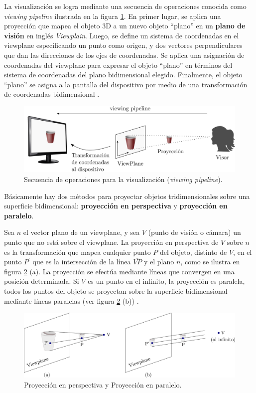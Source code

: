 La visualización se logra mediante una secuencia de operaciones conocida como \textit{viewing pipeline} \citep{marsh2005applied} ilustrada en la figura \ref{fig:view0}. En primer lugar, se aplica una proyección que mapea el objeto 3D a un nuevo objeto ``plano'' en un \textbf{plano de visión} en inglés \textit{Viewplain}.
Luego, se define un sistema de coordenadas en el viewplane especificando un punto como origen, y dos vectores perpendiculares que dan las direcciones de los ejes de coordenadas. Se aplica una asignación de coordenadas del viewplane para expresar el objeto ``plano'' en términos del sistema de coordenadas del plano bidimensional elegido. Finalmente, el objeto ``plano'' se asigna a la pantalla del dispositivo por medio de una transformación de coordenadas bidimensional \citep{marsh2005applied}. 

\begin{figure}[ht]
\includegraphics[width=13cm]{Img/GEO/geo-view001.png}
\centering
\caption{\footnotesize{Secuencia de operaciones para la visualización (\textit{viewing pipeline}). }}
\label{fig:view0}
\end{figure}


Básicamente hay dos métodos para proyectar objetos tridimensionales sobre una superficie bidimensional:  \textbf{proyección en perspectiva} y \textbf{proyección en paralelo}. 

Sea $n$ el vector plano de un viewplane, y sea $V$ (punto de visión o cámara) un punto que no está sobre el viewplane. La proyección en perspectiva de $V$ sobre $n$ es la transformación que mapea cualquier punto $P$ del objeto, distinto de $V$, en el punto $P^{\prime}$ que es la intersección de la línea $\overline{VP}$ y el plano $n$, como se ilustra en figura \ref{geo-view1} (a). La proyección se efectúa mediante líneas que convergen en una posición determinada.
Si $V$ es un punto en el infinito, la proyección es paralela, todos los puntos del objeto se proyectan sobre la superficie bidimensional mediante líneas paralelas (ver figura \ref{geo-view1} (b)) \citep{marsh2005applied}.

\begin{figure}[h]
    \includegraphics[width=14cm]{Img/GEO/geo-view11.png}
    \centering
    \caption{\footnotesize{Proyección en perspectiva y Proyección en paralelo.}}
    \label{geo-view1}
\end{figure}


